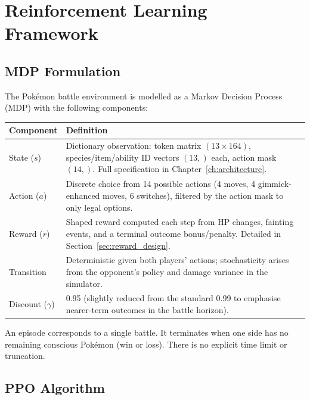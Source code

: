 \chapter{Reinforcement Learning Framework}
\label{ch:rl_framework}

\section{MDP Formulation}

The Pok\'{e}mon battle environment is modelled as a Markov Decision Process
(MDP) with the following components:

\begin{center}
\small
\begin{tabularx}{\textwidth}{l X}
  \toprule
  \textbf{Component} & \textbf{Definition} \\
  \midrule
  State ($s$)       & Dictionary observation: token matrix $(13 \times 164)$,
                      species/item/ability ID vectors $(13,)$ each, action
                      mask $(14,)$.  Full specification in
                      Chapter~\ref{ch:architecture}. \\
  Action ($a$)       & Discrete choice from 14 possible actions (4 moves,
                      4 gimmick-enhanced moves, 6 switches), filtered by the
                      action mask to only legal options. \\
  Reward ($r$)       & Shaped reward computed each step from HP changes,
                      fainting events, and a terminal outcome bonus/penalty.
                      Detailed in Section~\ref{sec:reward_design}. \\
  Transition         & Deterministic given both players' actions;
                      stochasticity arises from the opponent's policy and
                      damage variance in the simulator. \\
  Discount ($\gamma$) & 0.95 (slightly reduced from the standard 0.99 to
                       emphasise nearer-term outcomes in the battle horizon). \\
  \bottomrule
\end{tabularx}
\end{center}

An episode corresponds to a single battle.  It terminates when one side has no
remaining conscious Pok\'{e}mon (win or loss).  There is no explicit time limit
or truncation.

\section{PPO Algorithm}

